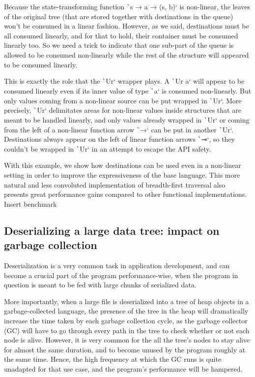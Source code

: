 \documentclass[english]{jflart}
\newcommand{\TODO}[1]{{\color{red}\large #1}}
\begin{document}
Because the state-transforming function \texttt`s → a → (s, b)` is non-linear, the leaves of the original tree (that are stored together with destinations in the queue) won't be consumed in a linear fashion. However, as we said, destinations must be all consumed linearly, and for that to hold, their container must be consumed linearly too. So we need a trick to indicate that one sub-part of the queue is allowed to be consumed non-linearly while the rest of the structure will appeared to be consumed linearly.

This is exactly the role that the \texttt`Ur` wrapper plays. A \texttt`Ur a` will appear to be consumed linearly even if its inner value of type \texttt`a` is consumed non-linearly. But only values coming from a non-linear source can be put wrapped in \texttt`Ur`. More precisely, \texttt`Ur` delimitates areas for non-linear values inside structures that are meant to be handled linearly, and only values already wrapped in \texttt`Ur` or coming from the left of a non-linear function arrow \texttt`→` can be put in another \texttt`Ur`. Destinations always appear on the left of linear function arrows \texttt`⊸`, so they couldn't be wrapped in \texttt`Ur` in an attempt to escape the API safety.

With this example, we show how destinations can be used even in a non-linear setting in order to improve the expressiveness of the base language. This more natural and less convoluted implementation of breadth-first traversal also presents great performance gains compared to other functional implementations. \TODO{Insert benchmark}

\subsection{Deserializing a large data tree: impact on garbage collection}

Deserialization is a very common task in application development, and can become a crucial part of the program performance-wise, when the program in question is meant to be fed with large chunks of serialized data.

More importantly, when a large file is deserialized into a tree of heap objects in a garbage-collected language, the presence of the tree in the heap will dramatically increase the time taken by each garbage collection cycle, as the garbage collector (GC) will have to go through every path in the tree to check whether or not each node is alive. However, it is very common for the all the tree's nodes to stay alive for almost the same duration, and to become unused by the program roughly at the same time. Hence, the high frequency at which the GC runs is quite unadapted for that use case, and the program's performance will be hampered.
\end{document}
